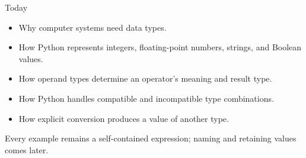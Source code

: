 \documentclass[aspectratio=169,10pt]{beamer}
\begin{document}
\makedecktitle

\begin{frame}{Today}

  \begin{itemize}

    \item Why computer systems need data types.

    \item How Python represents integers, floating-point numbers, strings, and Boolean values.

    \item How operand types determine an operator's meaning and result type.

    \item How Python handles compatible and incompatible type combinations.

    \item How explicit conversion produces a value of another type.

  \end{itemize}

  \begin{keyidea}

    Every example remains a self-contained expression; naming and retaining values comes later.

  \end{keyidea}

\end{frame}

\end{document}
